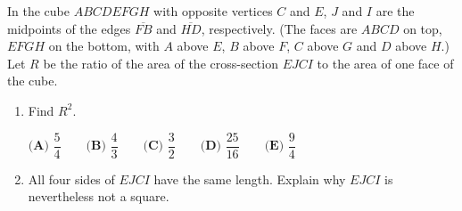 In the cube $ABCDEFGH$ with opposite vertices $C$ and $E$, $J$ and $I$ are the midpoints of the edges $\overline{FB}$ and $\overline{HD}$, respectively. (The faces are $ABCD$ on top, $EFGH$ on the bottom, with $A$ above $E$, $B$ above $F$, $C$ above $G$ and $D$ above $H$.) Let $R$ be the ratio of the area of the cross-section $EJCI$ to the area of one face of the cube.
\begin{enumerate}
\item[(a)] Find $R^2$.

$\textbf{(A) }\dfrac54\qquad\textbf{(B) }\dfrac43\qquad\textbf{(C) }\dfrac32\qquad\textbf{(D) }\dfrac{25}{16}\qquad\textbf{(E) }\dfrac94$
\item[(b)] All four sides of $EJCI$ have the same length. Explain why $EJCI$ is nevertheless not a square.
\end{enumerate}
